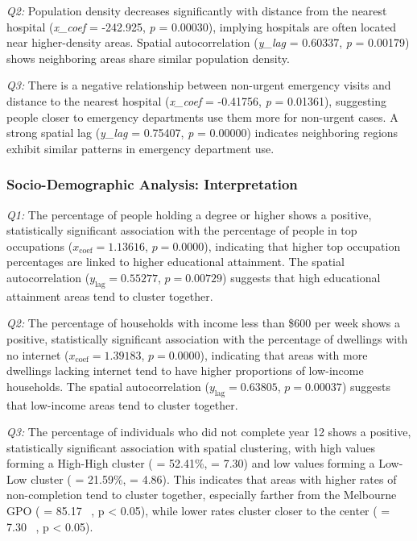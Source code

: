 \documentclass[
	a4paper, %
	10pt, %
	unnumberedsections, %
	twoside, %
]{LTJournalArticle}
\begin{document}
\textit{Q2:} Population density decreases significantly with distance from the nearest hospital (\textit{x\_coef} = -242.925, \textit{p} = 0.00030), implying hospitals are often located near higher-density areas. Spatial autocorrelation (\textit{y\_lag} = 0.60337, \textit{p} = 0.00179) shows neighboring areas share similar population density.

\textit{Q3:} There is a negative relationship between non-urgent emergency visits and distance to the nearest hospital (\textit{x\_coef} = -0.41756, \textit{p} = 0.01361), suggesting people closer to emergency departments use them more for non-urgent cases. A strong spatial lag (\textit{y\_lag} = 0.75407, \textit{p} = 0.00000) indicates neighboring regions exhibit similar patterns in emergency department use.


\subsubsection{Socio-Demographic Analysis: Interpretation}\leavevmode

\textit{Q1:} The percentage of people holding a degree or higher shows a positive, statistically significant association with the percentage of people in top occupations ($x_{\text{coef}} = 1.13616$, $p = 0.0000$), indicating that higher top occupation percentages are linked to higher educational attainment. The spatial autocorrelation ($y_{\text{lag}} = 0.55277$, $p = 0.00729$) suggests that high educational attainment areas tend to cluster together.

\textit{Q2:} The percentage of households with income less than \$600 per week shows a positive, statistically significant association with the percentage of dwellings with no internet ($x_{\text{coef}} = 1.39183$, $p = 0.0000$), indicating that areas with more dwellings lacking internet tend to have higher proportions of low-income households. The spatial autocorrelation ($y_{\text{lag}} = 0.63805$, $p = 0.00037$) suggests that low-income areas tend to cluster together.

\textit{Q3:} The percentage of individuals who did not complete year 12 shows a positive, statistically significant association with spatial clustering, with high values forming a High-High cluster ( = 52.41\%,  = 7.30) and low values forming a Low-Low cluster ( = 21.59\%,  = 4.86). This indicates that areas with higher rates of non-completion tend to cluster together, especially farther from the Melbourne GPO ( = 85.17 \ , p < 0.05), while lower rates cluster closer to the center ( = 7.30 \ , p < 0.05).
\end{document}
